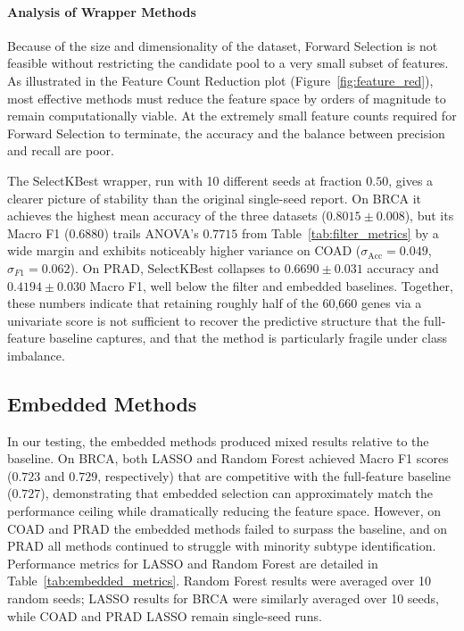 \documentclass{article}
\begin{document}
\paragraph{Analysis of Wrapper Methods}
Because of the size and dimensionality of the dataset, Forward Selection is not feasible without restricting the candidate pool to a very small subset of features. As illustrated in the Feature Count Reduction plot (Figure~\ref{fig:feature_red}), most effective methods must reduce the feature space by orders of magnitude to remain computationally viable. At the extremely small feature counts required for Forward Selection to terminate, the accuracy and the balance between precision and recall are poor.

The SelectKBest wrapper, run with 10 different seeds at fraction $0.50$, gives a clearer picture of stability than the original single-seed report. On BRCA it achieves the highest mean accuracy of the three datasets ($0.8015 \pm 0.008$), but its Macro F1 ($0.6880$) trails ANOVA's $0.7715$ from Table~\ref{tab:filter_metrics} by a wide margin and exhibits noticeably higher variance on COAD ($\sigma_{\mathrm{Acc}} = 0.049$, $\sigma_{F1} = 0.062$). On PRAD, SelectKBest collapses to $0.6690 \pm 0.031$ accuracy and $0.4194 \pm 0.030$ Macro F1, well below the filter and embedded baselines. Together, these numbers indicate that retaining roughly half of the 60{,}660 genes via a univariate score is not sufficient to recover the predictive structure that the full-feature baseline captures, and that the method is particularly fragile under class imbalance.

\subsection{Embedded Methods}

In our testing, the embedded methods produced mixed results relative to the baseline. On BRCA, both LASSO and Random Forest achieved Macro F1 scores ($0.723$ and $0.729$, respectively) that are competitive with the full-feature baseline ($0.727$), demonstrating that embedded selection can approximately match the performance ceiling while dramatically reducing the feature space. However, on COAD and PRAD the embedded methods failed to surpass the baseline, and on PRAD all methods continued to struggle with minority subtype identification. Performance metrics for LASSO and Random Forest are detailed in Table~\ref{tab:embedded_metrics}. Random Forest results were averaged over 10 random seeds; LASSO results for BRCA were similarly averaged over 10 seeds, while COAD and PRAD LASSO remain single-seed runs.
\end{document}
